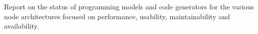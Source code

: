 Report on the status of programming models and code generators for the
various node architectures focused on performance, usability, maintainability
and  availability.  
